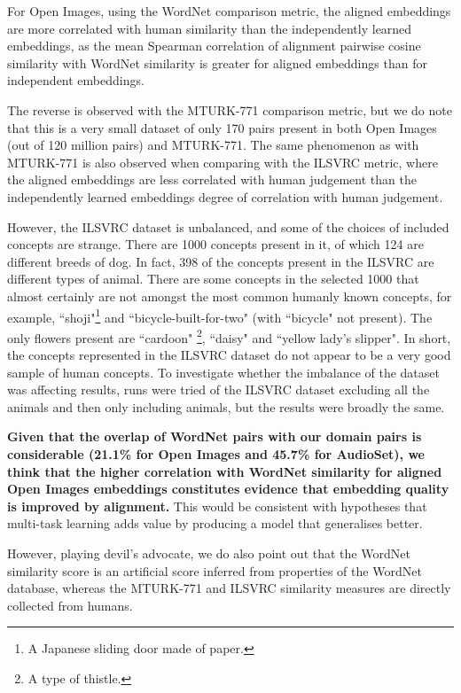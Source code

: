 For Open Images, using the WordNet comparison metric, the aligned embeddings are more correlated with human similarity than the independently learned embeddings, as the mean Spearman correlation of alignment pairwise cosine similarity with WordNet similarity is greater for aligned embeddings than for independent embeddings. 

The reverse is observed with the MTURK-771 comparison metric, but we do note that this is a very small dataset of only 170 pairs present in both Open Images (out of 120 million pairs) and MTURK-771. The same phenomenon as with MTURK-771 is also observed when comparing with the ILSVRC metric, where the aligned embeddings are less correlated with human judgement than the independently learned embeddings degree of correlation with human judgement. 

However, the ILSVRC dataset is unbalanced, and some of the choices of included concepts are strange. There are 1000 concepts present in it, of which 124 are different breeds of dog. In fact, 398 of the concepts present in the ILSVRC are different types of animal. There are some concepts in the selected 1000 that almost certainly are not amongst the most common humanly known concepts, for example, ``shoji"\footnote{A Japanese sliding door made of paper.} and ``bicycle-built-for-two" (with ``bicycle" not present). The only flowers present are ``cardoon" \footnote{A type of thistle.}, ``daisy" and ``yellow lady's slipper". In short, the concepts represented in the ILSVRC dataset do not appear to be a very good sample of human concepts. To investigate whether the imbalance of the dataset was affecting results, runs were tried of the ILSVRC dataset excluding all the animals and then only including animals, but the results were broadly the same. 

\textbf{Given that the overlap of WordNet pairs with our domain pairs is considerable (21.1\% for Open Images and 45.7\% for AudioSet), we think that the higher correlation with WordNet similarity for aligned Open Images embeddings constitutes evidence that embedding quality is improved by alignment.} This would be consistent with hypotheses that multi-task learning adds value by producing a model that generalises better.

However, playing devil's advocate, we do also point out that the WordNet similarity score is an artificial score inferred from properties of the WordNet database, whereas the MTURK-771 and  ILSVRC similarity measures are directly collected from humans. 

